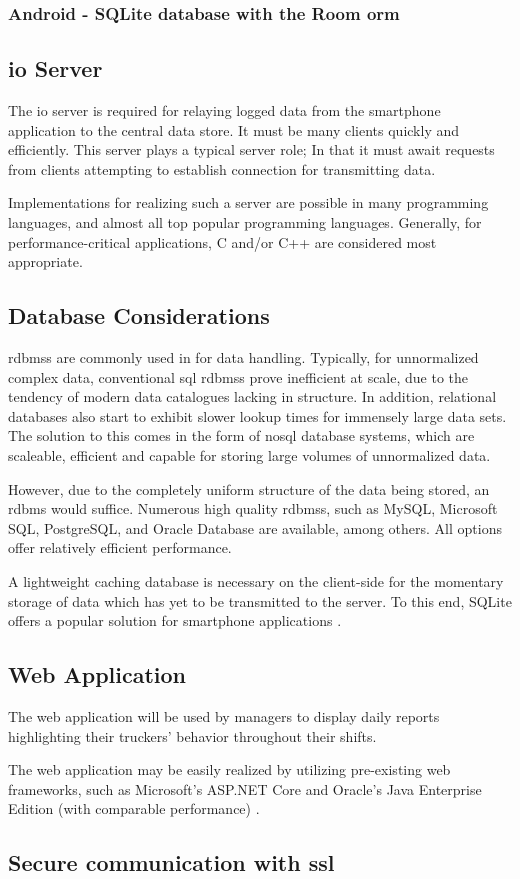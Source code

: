 \subsubsection{Android - SQLite database with the Room \ac{orm}}

\subsection{\ac{io} Server}
The \ac{io} server is required for relaying logged data from the smartphone application to the central data store. It must be many clients quickly and efficiently.
This server plays a typical server role; In that it must await requests from clients attempting to establish connection for transmitting data.

Implementations for realizing such a server are possible in many programming languages, and almost all top popular programming languages. 
Generally, for performance-critical applications, C and/or C++ are considered most appropriate. \cite{ogala2020comparative}

\subsection{Database Considerations}
\ac{rdbms}s are commonly used in for data handling.
Typically, for unnormalized complex data, conventional \ac{sql} \ac{rdbms}s prove inefficient at scale, due to the tendency of modern data catalogues lacking in structure.
In addition, relational databases also start to exhibit slower lookup times for immensely large data sets.
The solution to this comes in the form of \ac{nosql} database systems, which are scaleable, efficient and capable for storing large volumes of unnormalized data. \cite{gupta2017nosql} \cite{qader2018comparative} \cite{ongo2018hybrid}

However, due to the completely uniform structure of the data being stored, an \ac{rdbms} would suffice.
Numerous high quality \ac{rdbms}s, such as MySQL, Microsoft SQL, PostgreSQL, and Oracle Database are available, among others. All options offer relatively efficient performance.
\cite{truskowski2020comparison}

A lightweight caching database is necessary on the client-side for the momentary storage of data which has yet to be transmitted to the server. To this end, SQLite offers a popular solution for smartphone applications \cite{bhosale2015sqlite}.

\subsection{Web Application}
The web application will be used by managers to display daily reports highlighting their truckers' behavior throughout their shifts.

The web application may be easily realized by utilizing pre-existing web frameworks, such as Microsoft's ASP.NET Core and Oracle's Java Enterprise Edition (with comparable performance) \cite{kronis2018performance}.

\subsection{Secure communication with \ac{ssl}}

\pagebreak
